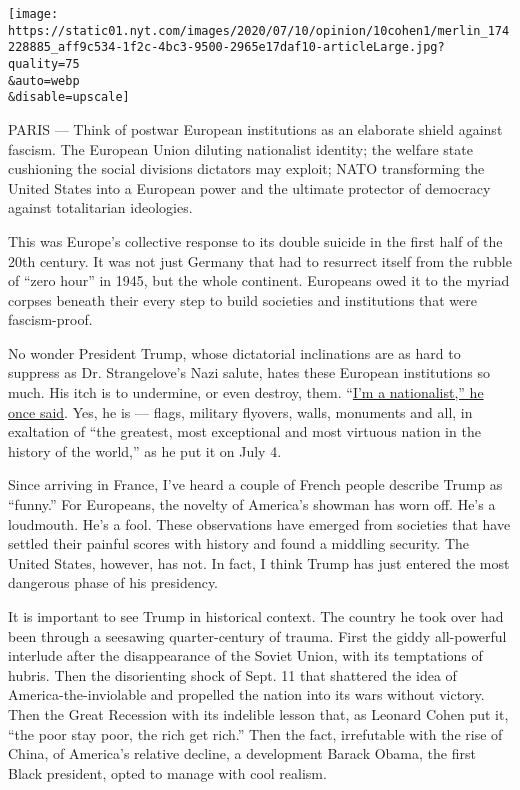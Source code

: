 \texttt{[image: https://static01.nyt.com/images/2020/07/10/opinion/10cohen1/merlin\_174228885\_aff9c534-1f2c-4bc3-9500-2965e17daf10-articleLarge.jpg?quality=75\\\&auto=webp\\\&disable=upscale]}

PARIS --- Think of postwar European institutions as an elaborate shield
against fascism. The European Union diluting nationalist identity; the
welfare state cushioning the social divisions dictators may exploit;
NATO transforming the United States into a European power and the
ultimate protector of democracy against totalitarian ideologies.

This was Europe's collective response to its double suicide in the first
half of the 20th century. It was not just Germany that had to resurrect
itself from the rubble of ``zero hour'' in 1945, but the whole
continent. Europeans owed it to the myriad corpses beneath their every
step to build societies and institutions that were fascism-proof.

No wonder President Trump, whose dictatorial inclinations are as hard to
suppress as Dr. Strangelove's Nazi salute, hates these European
institutions so much. His itch is to undermine, or even destroy, them.
``\href{https://www.nytimes.com/2018/10/23/us/politics/nationalist-president-trump.html}{I'm
a nationalist,'' he once said}. Yes, he is --- flags, military flyovers,
walls, monuments and all, in exaltation of ``the greatest, most
exceptional and most virtuous nation in the history of the world,'' as
he put it on July 4.

Since arriving in France, I've heard a couple of French people describe
Trump as ``funny.'' For Europeans, the novelty of America's showman has
worn off. He's a loudmouth. He's a fool. These observations have emerged
from societies that have settled their painful scores with history and
found a middling security. The United States, however, has not. In fact,
I think Trump has just entered the most dangerous phase of his
presidency.

It is important to see Trump in historical context. The country he took
over had been through a seesawing quarter-century of trauma. First the
giddy all-powerful interlude after the disappearance of the Soviet
Union, with its temptations of hubris. Then the disorienting shock of
Sept. 11 that shattered the idea of America-the-inviolable and propelled
the nation into its wars without victory. Then the Great Recession with
its indelible lesson that, as Leonard Cohen put it, ``the poor stay
poor, the rich get rich.'' Then the fact, irrefutable with the rise of
China, of America's relative decline, a development Barack Obama, the
first Black president, opted to manage with cool realism.

